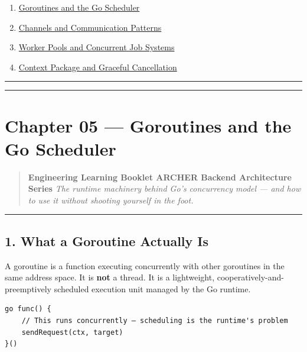 \documentclass[11pt,a4paper,oneside]{book}
\providecommand{\tightlist}{\setlength{\itemsep}{0pt}\setlength{\parskip}{0pt}}
\begin{document}
\begin{enumerate}
\def\labelenumi{\arabic{enumi}.}
\setcounter{enumi}{4}
\tightlist
\item
  \protect\hyperlink{chapter-05--goroutines-and-the-go-scheduler}{Goroutines
  and the Go Scheduler}
\item
  \protect\hyperlink{chapter-06--channels-and-communication-patterns}{Channels
  and Communication Patterns}
\item
  \protect\hyperlink{chapter-07--worker-pools-and-concurrent-job-systems}{Worker
  Pools and Concurrent Job Systems}
\item
  \protect\hyperlink{chapter-08--context-package-and-graceful-cancellation}{Context
  Package and Graceful Cancellation}
\end{enumerate}

\begin{center}\rule{0.5\linewidth}{0.5pt}\end{center}

\begin{center}\rule{0.5\linewidth}{0.5pt}\end{center}

\section{Chapter 05 --- Goroutines and the Go
Scheduler}

\begin{quote}
\textbf{Engineering Learning Booklet \textbar{} ARCHER Backend
Architecture Series} \emph{The runtime machinery behind Go's concurrency
model --- and how to use it without shooting yourself in the foot.}
\end{quote}

\begin{center}\rule{0.5\linewidth}{0.5pt}\end{center}

\subsection{1. What a Goroutine Actually
Is}

A goroutine is a function executing concurrently with other goroutines
in the same address space. It is \textbf{not} a thread. It is a
lightweight, cooperatively-and-preemptively scheduled execution unit
managed by the Go runtime.

\begin{verbatim}
go func() {
    // This runs concurrently — scheduling is the runtime's problem
    sendRequest(ctx, target)
}()
\end{verbatim}
\end{document}
